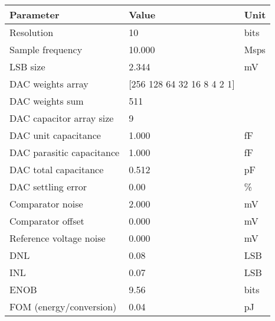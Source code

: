 \begin{tabular}{lll}
\toprule
Parameter & Value & Unit \\
\midrule
Resolution & 10 & bits \\
Sample frequency & 10.000 & Msps \\
LSB size & 2.344 & mV \\
DAC weights array & [256 128  64  32  16   8   4   2   1] &  \\
DAC weights sum & 511 &  \\
DAC capacitor array size & 9 &  \\
DAC unit capacitance & 1.000 & fF \\
DAC parasitic capacitance & 1.000 & fF \\
DAC total capacitance & 0.512 & pF \\
DAC settling error & 0.00 & \% \\
Comparator noise & 2.000 & mV \\
Comparator offset & 0.000 & mV \\
Reference voltage noise & 0.000 & mV \\
DNL & 0.08 & LSB \\
INL & 0.07 & LSB \\
ENOB & 9.56 & bits \\
FOM (energy/conversion) & 0.04 & pJ \\
\bottomrule
\end{tabular}
